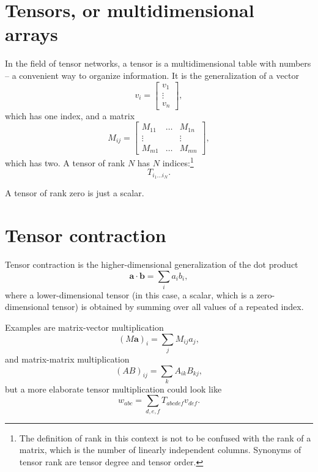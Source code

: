 \section{Tensors, or multidimensional arrays}
In the field of tensor networks, a tensor is a multidimensional table with numbers -- a
convenient way to organize information. It is the generalization of a vector
\begin{equation}
  v_i =
  \begin{bmatrix}
    v_1 \\
    \vdots \\
    v_n
  \end{bmatrix},
\end{equation}
which has one index, and a matrix
\begin{equation}
  M_{i j} =
  \begin{bmatrix}
  M_{1 1} & \dots & M_{1 n} \\
  \vdots  & & \vdots \\
  M_{m 1} & \dots & M_{m n}
  \end{bmatrix},
\end{equation}
which has two.
A tensor of rank $N$ has $N$ indices:\footnote{The definition of rank in this
context is not to be confused with the rank of a matrix, which is the number of
linearly independent columns. Synonyms of tensor rank are tensor degree and
tensor order.}
\begin{equation}
  T_{i_1 \dots i_N}.
\end{equation}

A tensor of rank zero is just a scalar.

\section{Tensor contraction}

Tensor contraction is the higher-dimensional generalization of the dot product
\begin{equation}
  \bm{a} \cdot \bm{b} = \sum_i a_i b_i,
\end{equation}
where a lower-dimensional tensor (in this case, a scalar, which is a
zero-dimensional tensor) is obtained by summing over all values of a repeated
index.

Examples are matrix-vector multiplication
\begin{equation}
  (M \bm{a})_{i} = \sum_j M_{i j} a_j,
\end{equation}
and matrix-matrix multiplication
\begin{equation}
  (A B)_{i j} = \sum_k A_{i k} B_{k j},
\end{equation}
but a more elaborate tensor multiplication could look like
\begin{equation}
  w_{a b c} = \sum_{d, e, f} T_{a b c d e f} v_{d e f}.
\end{equation}

